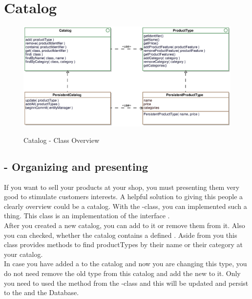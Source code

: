 \newpage
\section{Catalog}

\begin{figure}[ht]
	\centering
  \includegraphics[width=1.0\textwidth]{images/Catalog_Overview.eps}
	\label{catalog_overview}
	\caption{Catalog - Class Overview}
\end{figure}

\subsection{ - Organizing and presenting }
If you want to sell your products at your shop, you must presenting them very good to stimulate customers interests. A helpful solution to giving this people a clearly overview could be
a catalog. With the -class, you can implemented such a thing. This class is an implementation of the interface .\\
After you created a new catalog, you can add  to it or remove them from it. Also you can checked, whether the catalog contains a defined . Aside from you 
this class provides methods to find productTypes by their name or their category at your catalog.\\
In case you have added a  to the catalog and now you are changing this type, you do not need remove the old type from this catalog and add the new to it. Only you need to 
used the method  from the -class and this  will be updated and persist to the  
and the Database.

